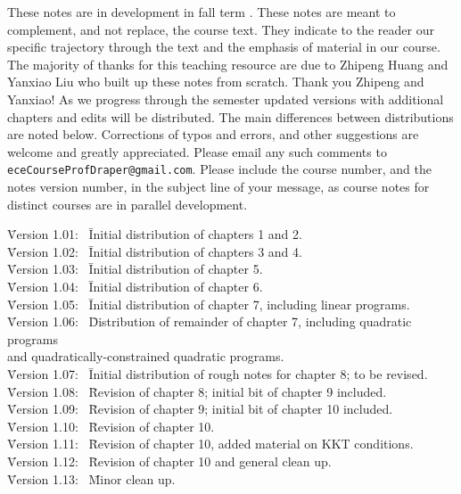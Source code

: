 \documentclass{tufte-book} %
\theoremstyle{definition}
\theoremstyle{remark}
\numberwithin{section}{chapter}
\numberwithin{equation}{chapter}
\numberwithin{figure}{chapter}
\begin{document}
\noindent These notes are in development in fall term \the\year.
These notes are meant to complement, and not replace, the course text.
They indicate to the reader our specific trajectory through the text
and the emphasis of material in our course.  The majority of thanks
for this teaching resource are due to Zhipeng Huang and Yanxiao Liu
who built up these notes from scratch.  Thank you Zhipeng and Yanxiao!
As we progress through the semester updated versions with additional
chapters and edits will be distributed.  The main differences between
distributions are noted below.  Corrections of typos and errors, and
other suggestions are welcome and greatly appreciated.  Please email any such
comments to \texttt{eceCourseProfDraper@gmail.com}.  Please include
the course number, and the notes version number,  in the subject line of your message, as course notes
for distinct courses are in parallel development. \vspace{0.2in} \\

\begin{tabbing}
\noindent \= Version 1.01: \ \= Initial distribution of chapters 1 and 2.\\
\noindent \= Version 1.02: \ \= Initial distribution of chapters 3 and 4.\\
\noindent \= Version 1.03: \ \= Initial distribution of chapter 5.\\
\noindent \= Version 1.04: \ \= Initial distribution of chapter 6.\\
\noindent \= Version 1.05: \ \= Initial distribution of chapter 7, including linear programs.\\
\noindent \= Version 1.06: \ \= Distribution of remainder of chapter 7, including quadratic programs \\ \hspace{6em} and quadratically-constrained quadratic programs.\\
\noindent \= Version 1.07: \ \= Initial distribution of rough notes for chapter 8; to be revised.\\
\noindent \= Version 1.08: \ \= Revision of chapter 8; initial bit of chapter 9 included.\\
\noindent \= Version 1.09: \ \= Revision of chapter 9; initial bit of chapter 10 included.\\
\noindent \= Version 1.10: \ \= Revision of chapter 10.\\
\noindent \= Version 1.11: \ \= Revision of chapter 10, added material on KKT conditions.\\
\noindent \= Version 1.12: \ \= Revision of chapter 10 and general clean up.\\
\noindent \= Version 1.13: \ \= Minor clean up.\\

\end{tabbing}
\end{document}
